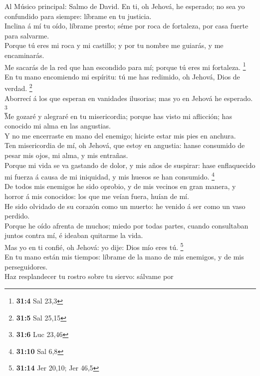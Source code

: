  Al Músico principal: Salmo de David. En ti, oh Jehová, he
esperado; no sea yo confundido para siempre: líbrame en tu justicia.\\
 Inclina á mí tu oído, líbrame presto; séme por roca de
fortaleza, por casa fuerte para salvarme.\\
 Porque tú eres mi roca y mi castillo; y por tu nombre me
guiarás, y me encaminarás.\\
 Me sacarás de la red que han escondido para mí; porque tú
eres mi fortaleza. \footnote{\textbf{31:4} Sal 23,3}\\
 En tu mano encomiendo mi espíritu: tú me has redimido, oh
Jehová, Dios de verdad. \footnote{\textbf{31:5} Sal 25,15}\\
 Aborrecí á los que esperan en vanidades ilusorias; mas yo
en Jehová he esperado. \footnote{\textbf{31:6} Luc 23,46}\\
 Me gozaré y alegraré en tu misericordia; porque has visto
mi aflicción; has conocido mi alma en las angustias.\\
 Y no me encerraste en mano del enemigo; hiciste estar mis
pies en anchura.\\
 Ten misericordia de mí, oh Jehová, que estoy en angustia:
hanse consumido de pesar mis ojos, mi alma, y mis entrañas.\\
 Porque mi vida se va gastando de dolor, y mis años de
suspirar: hase enflaquecido mi fuerza á causa de mi iniquidad, y mis
huesos se han consumido. \footnote{\textbf{31:10} Sal 6,8}\\
 De todos mis enemigos he sido oprobio, y de mis vecinos
en gran manera, y horror á mis conocidos: los que me veían fuera, huían
de mí.\\
 He sido olvidado de su corazón como un muerto: he venido
á ser como un vaso perdido.\\
 Porque he oído afrenta de muchos; miedo por todas
partes, cuando consultaban juntos contra mí, é ideaban quitarme la
vida.\\
 Mas yo en ti confié, oh Jehová: yo dije: Dios mío eres
tú. \footnote{\textbf{31:14} Jer 20,10; Jer 46,5}\\
 En tu mano están mis tiempos: líbrame de la mano de mis
enemigos, y de mis perseguidores.\\
 Haz resplandecer tu rostro sobre tu siervo: sálvame por
